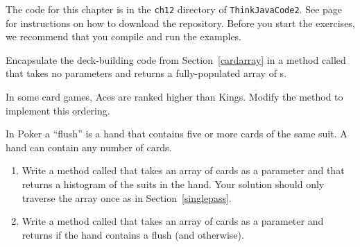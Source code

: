 The code for this chapter is in the {\tt ch12} directory of {\tt ThinkJavaCode2}.
See page~\pageref{code} for instructions on how to download the repository.
Before you start the exercises, we recommend that you compile and run the examples.



\begin{exercise}  %

Encapsulate the deck-building code from Section~\ref{cardarray} in a method called  that takes no parameters and returns a fully-populated array of s.

\end{exercise}


\begin{exercise}  %

In some card games, Aces are ranked higher than Kings.
Modify the  method to implement this ordering.

\end{exercise}


\begin{exercise}  %

In Poker a ``flush'' is a hand that contains five or more cards of the same suit.
A hand can contain any number of cards.


\begin{enumerate}

\item Write a method called  that takes an array of cards as a parameter and that returns a histogram of the suits in the hand.
Your solution should only traverse the array once as in Section~\ref{singlepass}.

\item Write a method called  that takes an array of cards as a parameter and returns  if the hand contains a flush (and  otherwise).

\end{enumerate}

\end{exercise}


